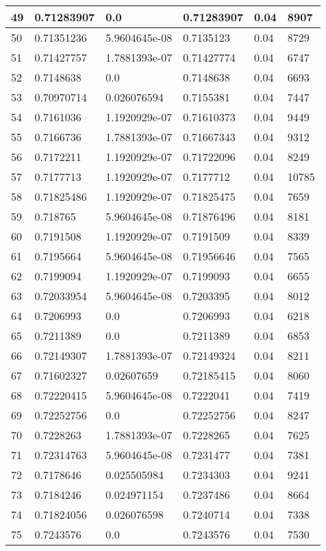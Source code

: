 \begin{longtable}{|l|l|l|l|l|l|}
49 & 0.71283907 & 0.0 & 0.71283907 & 0.04 & 8907 \\ \hline 
50 & 0.71351236 & 5.9604645e-08 & 0.7135123 & 0.04 & 8729 \\ \hline 
51 & 0.71427757 & 1.7881393e-07 & 0.71427774 & 0.04 & 6747 \\ \hline 
52 & 0.7148638 & 0.0 & 0.7148638 & 0.04 & 6693 \\ \hline 
53 & 0.70970714 & 0.026076594 & 0.7155381 & 0.04 & 7447 \\ \hline 
54 & 0.7161036 & 1.1920929e-07 & 0.71610373 & 0.04 & 9449 \\ \hline 
55 & 0.7166736 & 1.7881393e-07 & 0.71667343 & 0.04 & 9312 \\ \hline 
56 & 0.7172211 & 1.1920929e-07 & 0.71722096 & 0.04 & 8249 \\ \hline 
57 & 0.7177713 & 1.1920929e-07 & 0.7177712 & 0.04 & 10785 \\ \hline 
58 & 0.71825486 & 1.1920929e-07 & 0.71825475 & 0.04 & 7659 \\ \hline 
59 & 0.718765 & 5.9604645e-08 & 0.71876496 & 0.04 & 8181 \\ \hline 
60 & 0.7191508 & 1.1920929e-07 & 0.7191509 & 0.04 & 8339 \\ \hline 
61 & 0.7195664 & 5.9604645e-08 & 0.71956646 & 0.04 & 7565 \\ \hline 
62 & 0.7199094 & 1.1920929e-07 & 0.7199093 & 0.04 & 6655 \\ \hline 
63 & 0.72033954 & 5.9604645e-08 & 0.7203395 & 0.04 & 8012 \\ \hline 
64 & 0.7206993 & 0.0 & 0.7206993 & 0.04 & 6218 \\ \hline 
65 & 0.7211389 & 0.0 & 0.7211389 & 0.04 & 6853 \\ \hline 
66 & 0.72149307 & 1.7881393e-07 & 0.72149324 & 0.04 & 8211 \\ \hline 
67 & 0.71602327 & 0.02607659 & 0.72185415 & 0.04 & 8060 \\ \hline 
68 & 0.72220415 & 5.9604645e-08 & 0.7222041 & 0.04 & 7419 \\ \hline 
69 & 0.72252756 & 0.0 & 0.72252756 & 0.04 & 8247 \\ \hline 
70 & 0.7228263 & 1.7881393e-07 & 0.7228265 & 0.04 & 7625 \\ \hline 
71 & 0.72314763 & 5.9604645e-08 & 0.7231477 & 0.04 & 7381 \\ \hline 
72 & 0.7178646 & 0.025505984 & 0.7234303 & 0.04 & 9241 \\ \hline 
73 & 0.7184246 & 0.024971154 & 0.7237486 & 0.04 & 8664 \\ \hline 
74 & 0.71824056 & 0.026076598 & 0.7240714 & 0.04 & 7338 \\ \hline 
75 & 0.7243576 & 0.0 & 0.7243576 & 0.04 & 7530 \\ \hline 
\end{longtable}